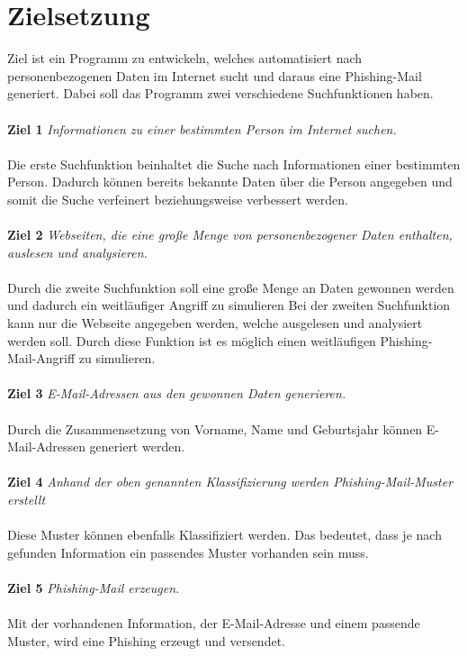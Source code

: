 \section{Zielsetzung}
\label {sec:Zielsetzung}
 Ziel ist ein Programm zu entwickeln, welches automatisiert nach personenbezogenen Daten im Internet sucht und daraus eine Phishing-Mail generiert. Dabei soll das Programm zwei verschiedene Suchfunktionen haben. \\\\
 {\bf Ziel 1} \textit{Informationen zu einer bestimmten Person im Internet suchen.}\\\\
 Die erste Suchfunktion beinhaltet die Suche nach Informationen einer bestimmten Person. Dadurch können bereits bekannte Daten über die Person angegeben und somit die Suche verfeinert beziehungsweise verbessert werden.\\\\
 {\bf Ziel 2} \textit{Webseiten, die eine große Menge von personenbezogener Daten enthalten, auslesen und analysieren.}\\\\
 Durch die zweite Suchfunktion soll eine große Menge an Daten gewonnen werden und dadurch ein weitläufiger Angriff zu simulieren
 Bei der zweiten Suchfunktion kann nur die Webseite angegeben werden, welche ausgelesen und analysiert werden soll. Durch diese Funktion ist es möglich einen weitläufigen Phishing-Mail-Angriff zu simulieren.\\\\
 {\bf Ziel 3} \textit{E-Mail-Adressen aus den gewonnen Daten generieren.}\\\\
 Durch die Zusammensetzung von Vorname, Name und Geburtsjahr können E-Mail-Adressen generiert werden.\\\\
 {\bf Ziel 4} \textit{Anhand der oben genannten Klassifizierung werden Phishing-Mail-Muster erstellt}\\\\
 Diese Muster können ebenfalls Klassifiziert werden. Das bedeutet, dass je nach gefunden Information ein passendes Muster vorhanden sein muss.\\\\
 {\bf Ziel 5} \textit{Phishing-Mail erzeugen.}\\\\
 Mit der vorhandenen Information, der E-Mail-Adresse und einem passende Muster, wird eine Phishing erzeugt und versendet.
 
